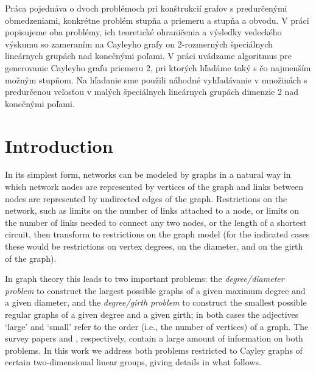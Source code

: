 \documentclass[a4paper,12pt,oneside]{report}%
\begin{document}
Pr\'aca pojedn\'ava o dvoch probl\'emoch pri kon\v{s}trukci\'i grafov s predur\v{c}en\'ymi obmedzeniami, konkr\'etne probl\'em stup\v{n}a a priemeru a stup\v{n}a a obvodu. V pr\'aci popisujeme oba probl\'emy, ich teoretick\'e ohrani\v{c}enia a v\'ysledky vedeck\'eho v\'yskumu so zameran\'im na Cayleyho grafy on $2$-rozmern\'ych \v{s}peci\'alnych line\'arnych grup\'ach nad kone\v{c}n\'ymi po\v{l}ami. V pr\'aci uv\'adzame algoritmus pre generovanie Cayleyho grafu priemeru 2, pri ktor\'ych h\v{l}ad\'ame tak\'y s \v{c}o najmen\v{s}\'im mo\v{z}n\'ym stup\v{n}om. Na h\v{l}adanie sme pou\v{z}ili n\'ahodn\'e vyh\v{l}ad\'avanie v mno\v{z}in\'ach s predur\v{c}enou ve\v{l}os\v{t}ou v mal\'ych \v{s}peci\'alnych line\'arnych grup\'ach dimenzie 2 nad kone\v{c}n\'ymi po\v{l}ami.

\newpage

\section{Introduction}

In its simplest form, networks can be modeled by graphs in a natural way in which network nodes are represented by vertices of the graph and links between nodes are represented by undirected edges of the graph. Restrictions on the network, such as limits on the number of links attached to a node, or limits on the number of links needed to connect any two nodes, or the length of a shortest circuit, then transform to restrictions on the graph model (for the indicated cases these would be restrictions on vertex degrees, on the diameter, and on the girth of the graph).
\medskip

In graph theory this leads to two important problems: the {\em degree/diameter problem} to construct the largest possible graphs of a given maximum degree and a given diameter, and the {\em degree/girth problem} to construct the smallest possible regular graphs of a given degree and a given girth; in both cases the adjectives `large' and `small' refer to the order (i.e., the number of vertices) of a graph. The survey papers \cite{Mil-Sir} and \cite{Exo-Jaj}, respectively, contain a large amount of information on both problems. In this work we address both problems restricted to Cayley graphs of certain two-dimensional linear groups, giving details in what follows.


\newpage

\end{document}
